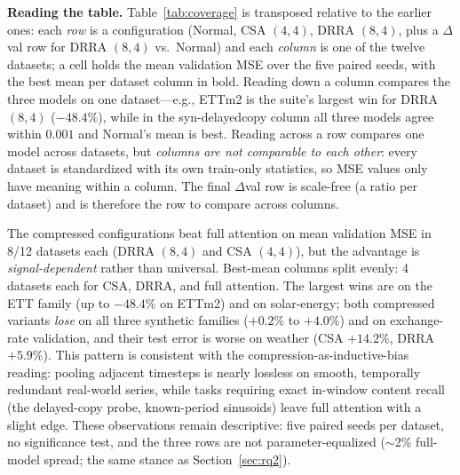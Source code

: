 \textbf{Reading the table.} Table~\ref{tab:coverage} is transposed relative
to the earlier ones: each \emph{row} is a configuration (Normal, CSA $(4,4)$,
DRRA $(8,4)$, plus a $\Delta$val row for DRRA $(8,4)$ vs.\ Normal) and each
\emph{column} is one of the twelve datasets; a cell holds the mean
validation MSE over the five paired seeds, with the best mean per dataset
column in bold. Reading down a column compares the three models on one
dataset---e.g., ETTm2 is the suite's largest win for DRRA $(8,4)$ ($-48.4\%$),
while in the syn-delayedcopy column all three models agree within $0.001$
and Normal's mean is best. Reading across a row compares one model across
datasets, but \emph{columns are not comparable to each other}: every
dataset is standardized with its own train-only statistics, so MSE values
only have meaning within a column. The final $\Delta$val row is
scale-free (a ratio per dataset) and is therefore the row to compare across
columns.

The compressed configurations beat full attention on mean validation MSE in
8/12 datasets each (DRRA $(8,4)$ and CSA $(4,4)$), but the advantage is
\emph{signal-dependent} rather than universal. Best-mean columns split evenly:
4 datasets each for CSA, DRRA, and full attention. The largest wins are on the
ETT family (up to $-48.4\%$ on ETTm2) and on solar-energy; both compressed
variants \emph{lose} on all three synthetic families ($+0.2\%$ to $+4.0\%$)
and on exchange-rate validation, and their test error is worse on weather
(CSA $+14.2\%$, DRRA $+5.9\%$). This pattern is consistent with the
compression-as-inductive-bias reading: pooling adjacent timesteps is nearly
lossless on smooth, temporally redundant real-world series, while tasks
requiring exact in-window content recall (the delayed-copy probe,
known-period sinusoids) leave full attention with a slight edge. These
observations remain descriptive: five paired seeds per dataset, no
significance test, and the three rows are not parameter-equalized
($\sim$2\% full-model spread; the same stance as
Section~\ref{sec:rq2}).

